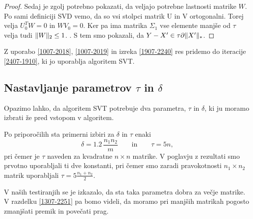 \begin{proof}
Sedaj je zgolj potrebno pokazati, da veljajo potrebne lastnosti matrike $W$.
Po sami definiciji SVD vemo, da so vsi stolpci matrik U in V ortogonalni. Torej velja $U_0^TW = 0$ in $WV_0 = 0$. Ker pa ima matrika $\Sigma_1$ vse elemente manjše od $\tau$ velja tudi $\lVert W\rVert_2 \leq 1$. . S tem smo pokazali, da $Y - X' \in \tau \partial \lVert X'\rVert_*$.
\end{proof}
Z uporabo \eqref{1007-2018}, \eqref{1007-2019}
in izreka \ref{1907-2240}
res pridemo do iteracije
\eqref{2407-1910}, ki jo uporablja algoritem SVT.
\iffalse
Tako res pridemo 
Po trditvi lahko sedaj zapišemo algoritem \eqref{1007-2018} - \eqref{1007-2019} kot \cite{CCS}
\[
    \begin{cases}
        X^k = \shrink_\tau(Y^{k-1}) \\
        Y^k = Y^{k-1} + \delta_k \proj(M - X^k) 
    \end{cases}
\]
\fi

\subsection{Nastavljanje parametrov $\tau$ in $\delta$} \label{1907-1648}
Opazimo lahko, da algoritem SVT potrebuje dva parametra, $\tau$ in $\delta$, ki ju moramo izbrati 
že pred vstopom v algoritem.

Po priporočilih \cite{CCS}
sta primerni izbiri za $\delta$ in $\tau$
enaki 
\[
    \delta = 1.2\, \dfrac{n_1 n_2}{m}\qquad\text{in}\qquad
    \tau = 5n,
\]
pri čemer je $\tau$ naveden za kvadratne $n\times n$ matrike.
V poglavju z rezultati smo prvotno uporabljali ti dve konstanti, pri 
čemer smo zaradi
pravokotnosti $n_1\times n_2$ matrik uporabljali
$\tau = 5\frac{n_1+n_2}{2}$.
\iffalse
Medtem, ko so koraki v samem algoritmu definirani kot množica korakov, 
smo v okviru rezultatov diplomske naloge, prvotno za premik uporabljali konstanto, ter korak nastavili na 
 po priporočilih \cite{CCS}. 
 \fi
\iffalse
Prav tako članek \cite{CCS} navaja, da je za matrike velikosti $\mathbb{R}^{n \times n}$ smiselno nastaviti $\tau = 5n$, vendar sem v moji implementaciji zaradi posploševanja na nekvadratne matrike, za matrike velikosti $\mathbb{R}^{n_1 \times n_2}$ parameter nastavil na
\[
    \tau = 5\, \frac{n_1+n_2}{2}
\]
\fi
V naših testiranjih se je izkazalo, da sta taka parametra dobra za večje matrike. V razdelku \ref{1307-2251} pa bomo videli, da moramo pri manjših matrikah pogosto zmanjšati premik in povečati prag.